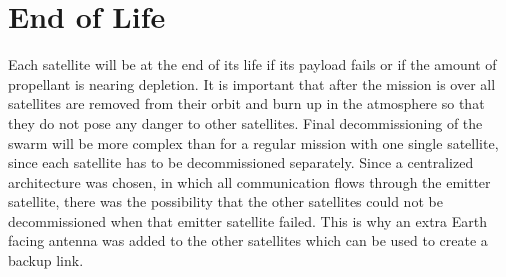 \section{End of Life}
\label{SSEOL}

Each satellite will be at the end of its life if its payload fails or if the amount of propellant is nearing depletion.
It is important that after the mission is over all satellites are removed from their orbit and burn up in the atmosphere so that they do not pose any danger to other satellites.
Final decommissioning of the swarm will be more complex than for a regular mission with one single satellite, since each satellite has to be decommissioned separately.
Since a centralized architecture was chosen, in which all communication flows through the emitter satellite, there was the possibility that the other satellites could not be decommissioned when that emitter satellite failed. This is why an extra Earth facing antenna was added to the other satellites which can be used to create a backup link.